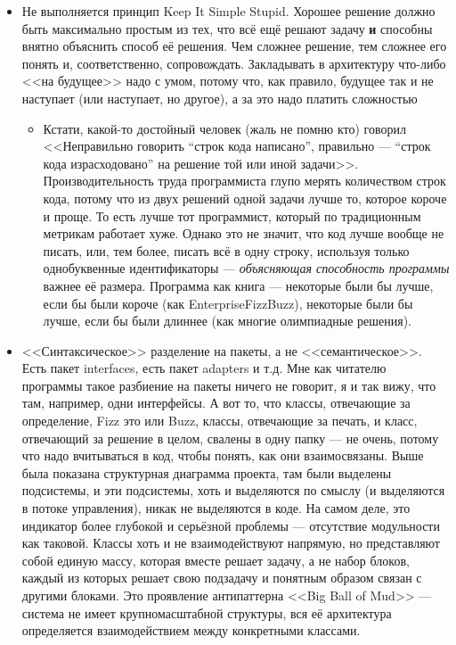 \documentclass{../text-style}
\begin{document}
\begin{itemize}
    \item Не выполняется принцип Keep It Simple Stupid. Хорошее решение должно быть максимально простым из тех, что всё ещё решают задачу \textbf{и} способны внятно объяснить способ её решения. Чем сложнее решение, тем сложнее его понять и, соответственно, сопровождать. Закладывать в архитектуру что-либо <<на будущее>> надо с умом, потому что, как правило, будущее так и не наступает (или наступает, но другое), а за это надо платить сложностью
    \begin{itemize}
        \item Кстати, какой-то достойный человек (жаль не помню кто) говорил <<Неправильно говорить ``строк кода написано'', правильно --- ``строк кода израсходовано'' на решение той или иной задачи>>. Производительность труда программиста глупо мерять количеством строк кода, потому что из двух решений одной задачи лучше то, которое короче и проще. То есть лучше тот программист, который по традиционным метрикам работает хуже. Однако это не значит, что код лучше вообще не писать, или, тем более, писать всё в одну строку, используя только однобуквенные идентификаторы --- \textit{объясняющая способность программы} важнее её размера. Программа как книга --- некоторые были бы лучше, если бы были короче (как EnterpriseFizzBuzz), некоторые были бы лучше, если бы были длиннее (как многие олимпиадные решения).
    \end{itemize}
    \item <<Синтаксическое>> разделение на пакеты, а не <<семантическое>>. Есть пакет interfaces, есть пакет adapters и т.д. Мне как читателю программы такое разбиение на пакеты ничего не говорит, я и так вижу, что там, например, одни интерфейсы. А вот то, что классы, отвечающие за определение, Fizz это или Buzz, классы, отвечающие за печать, и класс, отвечающий за решение в целом, свалены в одну папку --- не очень, потому что надо вчитываться в код, чтобы понять, как они взаимосвязаны. Выше была показана структурная диаграмма проекта, там были выделены подсистемы, и эти подсистемы, хоть и выделяются по смыслу (и выделяются в потоке управления), никак не выделяются в коде. На самом деле, это индикатор более глубокой и серьёзной проблемы --- отсутствие модульности как таковой. Классы хоть и не взаимодействуют напрямую, но представляют собой единую массу, которая вместе решает задачу, а не набор блоков, каждый из которых решает свою подзадачу и понятным образом связан с другими блоками. Это проявление антипаттерна <<Big Ball of Mud>> --- система не имеет крупномасштабной структуры, вся её архитектура определяется взаимодействием между конкретными классами.

\end{itemize}
\end{document}
